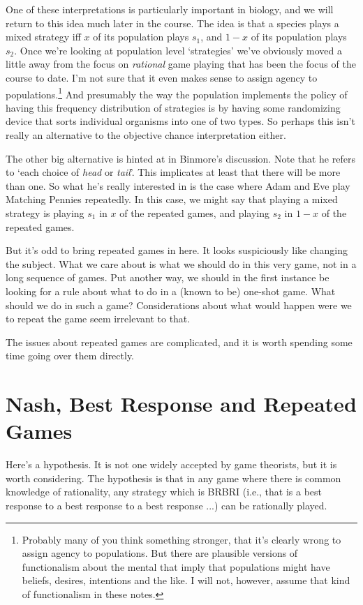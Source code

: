 One of these interpretations is particularly important in biology, and we will return to this idea much later in the course. The idea is that a species plays a mixed strategy  iff $x$ of its population plays $s_1$, and $1-x$ of its population plays $s_2$. Once we're looking at population level `strategies' we've obviously moved a little away from the focus on \textit{rational} game playing that has been the focus of the course to date. I'm not sure that it even makes sense to assign agency to populations.\footnote{Probably many of you think something stronger, that it's clearly wrong to assign agency to populations. But there are plausible versions of functionalism about the mental that imply that populations might have beliefs, desires, intentions and the like. I will not, however, assume that kind of functionalism in these notes.} And presumably the way the population implements the policy of having this frequency distribution of strategies is by having some randomizing device that  sorts individual organisms into one of two types. So perhaps this isn't really an alternative to the objective chance interpretation either.

The other big alternative is hinted at in Binmore's discussion. Note that he refers to `each choice of \textit{head} or \textit{tail}'. This implicates at least that there will be more than one. So what he's really interested in is the case where Adam and Eve play Matching Pennies repeatedly. In this case, we might say that playing a mixed strategy  is playing $s_1$ in $x$ of the repeated games, and playing $s_2$ in $1-x$ of the repeated games.

But it's odd to bring repeated games in here. It looks suspiciously like changing the subject. What we care about is what we should do in this very game, not in a long sequence of games. Put another way, we should in the first instance be looking for a rule about what to do in a (known to be) one-shot game. What should we do in such a game? Considerations about what would happen were we to repeat the game seem irrelevant to that.

The issues about repeated games are complicated, and it is worth spending some time going over them directly.

\section{Nash, Best Response and Repeated Games}

Here's a hypothesis. It is not one widely accepted by game theorists, but it is worth considering. The hypothesis is that in any game where there is common knowledge of rationality, any strategy which is BRBRI (i.e., that is a best response to a best response to a best response ...) can be rationally played.

